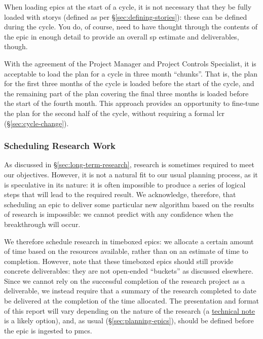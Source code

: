 When loading \glspl{epic} at the start of a \gls{cycle}, it is not necessary that they be fully loaded with \glspl{story} (defined as per \S\ref{sec:defining-stories}): these can be defined during the \gls{cycle}.
You do, of course, need to have thought through the contents of the \gls{epic} in enough detail to provide an overall \gls{sp} estimate and deliverables, though.

With the agreement of the Project Manager and Project Controls Specialist, it is acceptable to load the plan for a \gls{cycle} in three month ``chunks''.
That is, the plan for the first three months of the \gls{cycle} is loaded before the start of the \gls{cycle}, and the remaining part of the plan covering the final three months is loaded before the start of the fourth month.
This approach provides an opportunity to fine-tune the plan for the second half of the \gls{cycle}, without requiring a formal \gls{lcr} (\S\ref{sec:cycle-change}).

\subsubsection{Scheduling Research Work}
\label{sec:research}

As discussed in \S\ref{sec:long-term-research}, research is sometimes required
to meet our objectives. However, it is not a natural fit to our usual
planning process, as it is speculative in its nature: it is often
impossible to produce a series of logical steps that will lead to the
required result. We acknowledge, therefore, that scheduling an \gls{epic} to
deliver some particular new algorithm based on the results of research
is impossible: we cannot predict with any confidence when the
breakthrough will occur.

We therefore schedule research in \gls{timebox}ed \glspl{epic}: we allocate a certain amount of time based on the resources available, rather than on an estimate of time to completion.
However, note that these \gls{timebox}ed \glspl{epic} should still provide concrete deliverables: they are not open-ended ``buckets'' as discussed elsewhere.
Since we cannot rely on the successful completion of the research project as a deliverable, we instead require that a summary of the research completed to date be delivered at the completion of the time allocated.
The presentation and format of this report will vary depending on the nature of the research (a \href{https://sqr-000.lsst.io/}{technical note} is a likely option), and, as usual (\S\ref{sec:planning-epics}), should be defined before the \gls{epic} is ingested to \gls{pmcs}.

